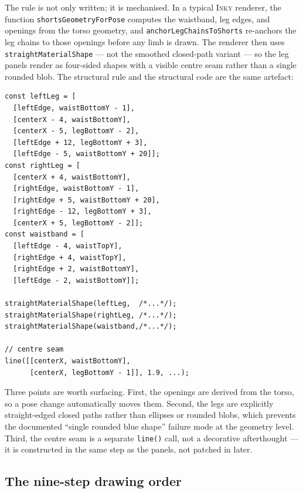 \documentclass[10pt,twocolumn]{article}
\newcommand{\inky}{\textsc{Inky}}
\begin{document}
The rule is not only written; it is mechanised. In a typical
\inky{} renderer, the function \texttt{shortsGeometryForPose}
computes the waistband, leg edges, and openings from the torso
geometry, and \texttt{anchorLegChainsToShorts} re-anchors the leg
chains to those openings before any limb is drawn. The renderer
then uses \texttt{straightMaterialShape} --- not the smoothed
closed-path variant --- so the leg panels render as four-sided
shapes with a visible centre seam rather than a single rounded
blob. The structural rule and the structural code are the same
artefact:

\begin{lstlisting}[style=paperjs,label={lst:shorts},caption={Illustrative renderer pattern: the parent--child chain encoded in geometry rather than prompt text. Coordinates are derived from torso anchors and the panels render as straight-edged closed shapes.}]
const leftLeg = [
  [leftEdge, waistBottomY - 1],
  [centerX - 4, waistBottomY],
  [centerX - 5, legBottomY - 2],
  [leftEdge + 12, legBottomY + 3],
  [leftEdge - 5, waistBottomY + 20]];
const rightLeg = [
  [centerX + 4, waistBottomY],
  [rightEdge, waistBottomY - 1],
  [rightEdge + 5, waistBottomY + 20],
  [rightEdge - 12, legBottomY + 3],
  [centerX + 5, legBottomY - 2]];
const waistband = [
  [leftEdge - 4, waistTopY],
  [rightEdge + 4, waistTopY],
  [rightEdge + 2, waistBottomY],
  [leftEdge - 2, waistBottomY]];

straightMaterialShape(leftLeg,  /*...*/);
straightMaterialShape(rightLeg, /*...*/);
straightMaterialShape(waistband,/*...*/);

// centre seam
line([[centerX, waistBottomY],
      [centerX, legBottomY - 1]], 1.9, ...);
\end{lstlisting}

\noindent
Three points are worth surfacing. First, the openings are derived
from the torso, so a pose change automatically moves them. Second,
the legs are explicitly straight-edged closed paths rather than
ellipses or rounded blobs, which prevents the documented ``single
rounded blue shape'' failure mode at the geometry level. Third, the
centre seam is a separate \texttt{line()} call, not a decorative
afterthought --- it is constructed in the same step as the panels,
not patched in later.

\subsection{The nine-step drawing order}
\label{sec:drawing-order}
\end{document}
